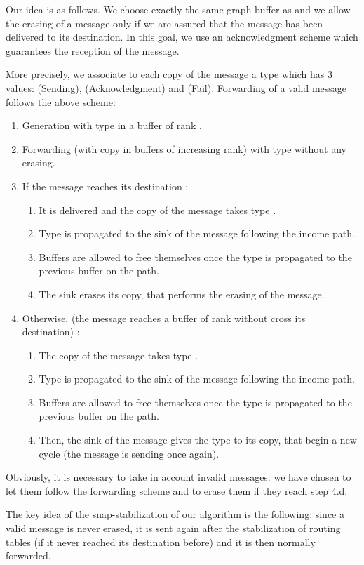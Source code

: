 \documentclass[11pt]{article}
\begin{document}
Our idea is as follows. We choose exactly the same graph buffer as \cite{MS78} and we allow the erasing of a message only if we are assured that the message has been delivered to its destination. In this goal, we use an acknowledgment scheme which guarantees the reception of the message.

More precisely, we associate to each copy of the message a type which has 3 values:  (Sending),  (Acknowledgment) and  (Fail). Forwarding of a valid message follows the above scheme:

\begin{enumerate}
\item Generation with type  in a buffer of rank .
\item Forwarding (with copy in buffers of increasing rank) with type  without any erasing.
\item If the message reaches its destination :
\begin{enumerate}
\item It is delivered and the copy of the message takes type .
\item Type  is propagated to the sink of the message following the income path.
\item Buffers are allowed to free themselves once the type  is propagated to the previous buffer on the path.
\item The sink erases its copy, that performs the erasing of the message.
\end{enumerate}
\item Otherwise, (the message reaches a buffer of rank  without cross its destination) :
\begin{enumerate}
\item The copy of the message takes type .
\item Type  is propagated to the sink of the message following the income path.
\item Buffers are allowed to free themselves once the type  is propagated to the previous buffer on the path.
\item Then, the sink of the message gives the type  to its copy, that begin a new cycle (the message is sending once again).
\end{enumerate}
\end{enumerate}

Obviously, it is necessary to take in account invalid messages: we have chosen to let them follow the forwarding scheme and to erase them if they reach step 4.d.

The key idea of the snap-stabilization of our algorithm is the following: since a valid message is never erased, it is sent again after the stabilization of routing tables (if it never reached its destination before) and it is then normally forwarded. 
\end{document}
